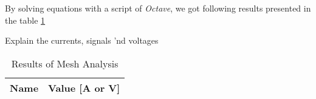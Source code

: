 By solving equations with a script of \textit{Octave}, we got following results presented in the table \ref{tab:op_octave}

Explain the currents, signals 'nd voltages

\begin{table}[h]
  \centering
  \begin{tabular}{|l|r|}
    \hline
    {\bf Name} & {\bf Value [A or V]} \\ \hline
    
  \end{tabular}
  \caption{Results of Mesh Analysis}
  \label{tab:op_octave}
\end{table}




